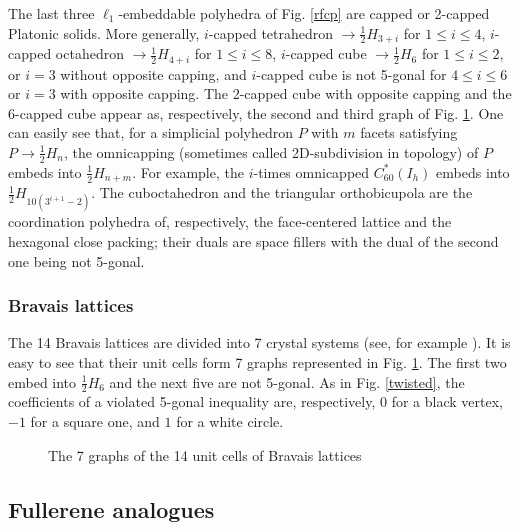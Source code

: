 \begin{remark}
The last three $\ell_1$-embeddable polyhedra of Fig. \ref{rfcp} are capped or 
2-capped Platonic solids. More generally, 
$i$-capped tetrahedron $\rightarrow\frac{1}{2}H_{3+i}$ for $1\leq i\leq 4$,
$i$-capped octahedron $\rightarrow\frac{1}{2}H_{4+i}$ for $1\leq i\leq 8$,
$i$-capped cube $\rightarrow\frac{1}{2}H_{6}$ for $1\leq i\leq 2$, or $i=3$ without opposite capping, and
$i$-capped cube is not 5-gonal for $4\leq i\leq 6$ or $i=3$ with opposite capping.
The 2-capped cube with opposite capping and the 6-capped cube appear as, respectively,
the second and third graph of Fig. \ref{bravais}.
One can easily see that, for a simplicial polyhedron $P$ with $m$ facets
satisfying $P\rightarrow\frac{1}{2}H_{n}$, the omnicapping 
(sometimes called 2D-subdivision in topology) 
of $P$ embeds into
$\frac{1}{2}H_{n+m}$. For example, the $i$-times omnicapped $C^*_{60}(I_h)$ embeds
into $\frac{1}{2}H_{10(3^{i+1}-2)}$. The cuboctahedron
and the triangular orthobicupola are the coordination polyhedra of, respectively, 
the face-centered lattice and the hexagonal close packing; their duals are 
space fillers with the dual of the second one being not 5-gonal. 
\end{remark}

\subsubsection{Bravais lattices}
The 14 Bravais lattices are divided into 7 crystal systems (see, for example
\cite{uk92}). It is easy to see that 
their unit cells form 7 graphs represented in Fig. \ref{bravais}. The first two 
embed into $\frac{1}{2}H_{6}$ and the next five are not 5-gonal. As in Fig. \ref{twisted},
the coefficients of a violated 5-gonal inequality
are, respectively, $0$ for a black vertex, $-1$ for a square one, and $1$ for a white circle.


\begin{figure}[htb]
\begin{center}
\caption{The 7 graphs of the 14 unit cells of Bravais lattices}\label{bravais}
\end{center}
\end{figure}

\clearpage 

\newpage
\subsection{Fullerene analogues}
